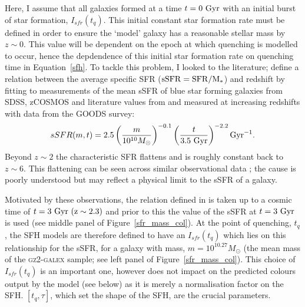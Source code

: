 Here, I assume that all galaxies formed at a time $t=0~\rm{Gyr}$ with an initial burst of star formation, $I_{sfr}(t_q)$. This initial constant star formation rate must be defined in order to ensure the `model' galaxy  has a reasonable stellar mass by $z\sim0$. This value will be dependent on the epoch at which quenching is modelled to occur, hence the depdendence of this initial star formation rate on quenching time in Equation~\ref{sfh}. To tackle this problem, I looked to the literature; \citet[][Equation 1]{peng10} define a relation between the average specific SFR ($\rm{sSFR}=SFR/M_*$) and redshift by fitting to measurements of the mean sSFR of blue star forming galaxies from SDSS, zCOSMOS and literature values from \cite{Elbaz07} and \cite{daddi07} measured at increasing redshifts with data from the GOODS survey:
\begin{equation}\label{eq:peng}
sSFR(m,t) = 2.5 \left( \frac{m}{10^{10} M_{\odot}} \right)^{-0.1} \left(\frac{t}{3.5 ~\rm{Gyr}}\right)^{-2.2} \rm{Gyr}^{-1}.
\end{equation}
Beyond $z \sim 2$ the characteristic SFR flattens and is roughly constant back to $z\sim6$. This flattening can be seen across similar observational data \citep{peng10, gonzalez10, bethermin12}; the cause is poorly understood but may reflect a physical limit to the sSFR of a galaxy. 

Motivated by these observations, the relation defined in \citet{peng10} is taken up to a cosmic time of $t=3~\rm{Gyr}~(z \sim 2.3)$ and prior to this the value of the sSFR at $t=3~\rm{Gyr}$ is used (see middle panel of Figure~\ref{sfr_mass_col}). At the point of quenching, $t_{q}$, the SFH models are therefore defined to have an $I_{sfr}(t_q)$ which lies on this relationship for the sSFR, for a galaxy with mass, $m = 10^{10.27} M_{\odot}$ (the mean mass of the \textsc{gz2-galex} sample; see left panel of Figure~\ref{sfr_mass_col}). This choice of $I_{sfr}(t_q)$ is an important one, however does not impact on the predicted colours output by the model (see below) as it is merely a normalisation factor on the SFH. $[t_q, \tau]$, which set the shape of the SFH, are the crucial parameters. 

